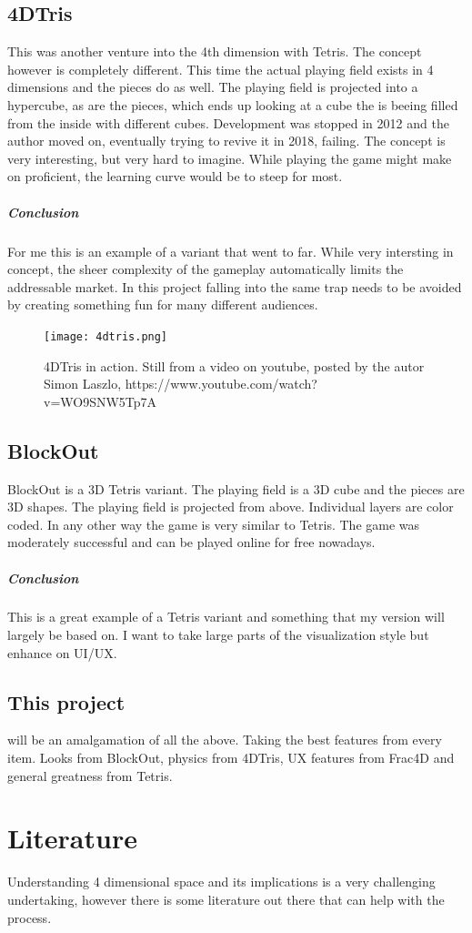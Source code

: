 \documentclass{article}
\begin{document}
\subsection{4DTris}
This was another venture into the 4th dimension with Tetris. The concept however is completely different. This time the actual playing field exists in 4 dimensions and the pieces do as well. The playing field is projected into a hypercube, as are the pieces, which ends up looking at a cube the is beeing filled from the inside with different cubes. Development was stopped in 2012 and the author moved on, eventually trying to revive it in 2018, failing. The concept is very interesting, but very hard to imagine. While playing the game might make on proficient, the learning curve would be to steep for most.
\subparagraph*{Conclusion}
For me this is an example of a variant that went to far. While very intersting in concept, the sheer complexity of the gameplay automatically limits the addressable market. In this project falling into the same trap needs to be avoided by creating something fun for many different audiences.
\begin{figure}
    \label{fig:4dtris}
    \centering
    \texttt{[image: 4dtris.png]}
    \caption{4DTris in action. Still from a video on youtube, posted by the autor Simon Laszlo, https://www.youtube.com/watch?v=WO9SNW5Tp7A}
\end{figure}
\subsection{BlockOut}
BlockOut is a 3D Tetris variant. The playing field is a 3D cube and the pieces are 3D shapes. 
The playing field is projected from above. Individual layers are color coded. In any other way the game is very similar to Tetris. The game was moderately successful and can be played online for free nowadays.
\subparagraph*{Conclusion}
This is a great example of a Tetris variant and something that my version will largely be based on. I want to take large parts of the visualization style but enhance on UI/UX.

\subsection{This project}
will be an amalgamation of all the above. Taking the best features from every item. Looks from BlockOut, physics from 4DTris, UX features from Frac4D and general greatness from Tetris.
\section{Literature}
Understanding 4 dimensional space and its implications is a very challenging undertaking, however there is some literature out there that can help with the process. 
\end{document}
